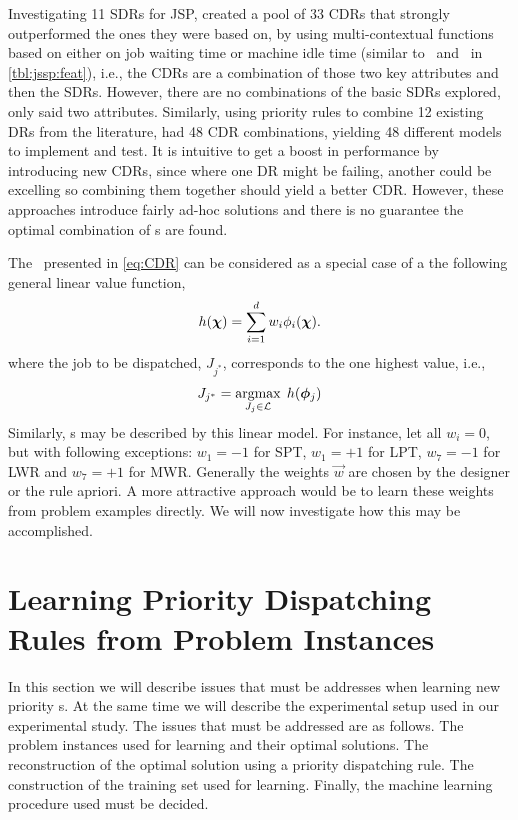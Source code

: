 \documentclass[smallextended]{svjour3}
\begin{document}
Investigating 11 SDRs for JSP, \cite{Lu13} created a pool of 33 CDRs that 
strongly outperformed the ones they were based on, by using multi-contextual 
functions based on either on job waiting time or machine idle time 
(similar to \phiwait\ and \phimacSlack\ in \cref{tbl:jssp:feat}), i.e., the 
CDRs are a combination of those two key attributes and then the SDRs. 
However, there are no combinations of the basic SDRs explored, only 
said two attributes.  
Similarly, using priority rules to combine 12 existing DRs from the literature, 
\cite{Yu13} had 48 CDR combinations, yielding 48 different models 
to implement and test. 
It is intuitive to get a boost in performance by introducing new CDRs, since 
where one DR might be failing, another could be excelling so combining them 
together should yield a better CDR. However, these approaches introduce fairly 
ad-hoc solutions and there is no guarantee the optimal combination of 
\dr s are found.


The \cdr\ presented in \cref{eq:CDR} can be 
considered as a special case of a the following general linear value function,
\begin{equation}\label{eq:jssp:linweights}
	h(\bm \chi)=\sum_{i=1}^d w_i\phi_i(\bm \chi).
\end{equation}
where the job to be dispatched, $J_{j^*}$, corresponds to the one highest 
value, i.e.,
\begin{equation}\label{eq:lin}
	J_{j^*}=\mathop{\rm argmax}_{J_j\in \mathcal{L}}\; h(\bm{\phi}_j)
\end{equation}
Similarly, \sdr s may be described by this linear model. For instance, let all 
$w_i=0$, but with following exceptions: $w_1=-1$ for SPT, $w_1=+1$ for LPT, 
$w_7=-1$ for LWR and $w_7=+1$ for MWR. Generally the weights $\vec{w}$ are 
chosen by the designer or the 
rule apriori.  A more attractive approach would be to learn these weights from 
problem examples directly. We will now investigate how this may be accomplished.


\section{Learning Priority Dispatching Rules from Problem Instances}\label{sec:gentrainingdata}

In this section we will describe issues that must be addresses when learning 
new priority \dr s. At the same time we will describe the experimental setup 
used in our experimental study. The issues that must be addressed are as 
follows. The problem instances used for learning and their optimal solutions. 
The reconstruction of the optimal solution using a priority dispatching rule. 
The construction of the training set used for learning. Finally, the
machine learning procedure used must be decided.
\end{document}
